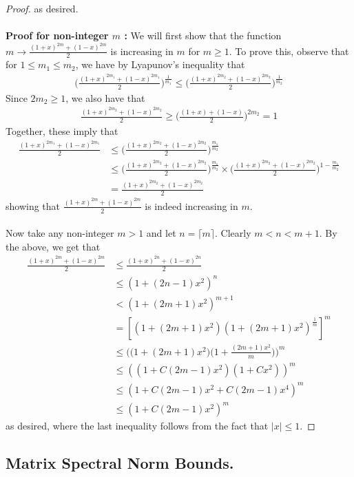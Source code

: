 \documentclass[11pt, reqno,english]{amsart}
\begin{document}
\begin{proof}
as desired. 
\\\\
\textbf{Proof for non-integer $m$ :}
We will first show that the function $m \to \frac{(1 + x)^{2m} + (1 - x)^{2m}}{2}$ is increasing in $m$ for $m \geq 1$. To prove this, observe that for $1 \leq m_1 \leq m_2$, we have by Lyapunov's inequality that
\begin{align*}
\bigg(\frac{(1 + x)^{2m_1} + (1 - x)^{2m_1}}{2}\bigg)^{\frac{1}{m_1}} \leq \bigg(\frac{(1 + x)^{2m_2} + (1 - x)^{2m_2}}{2}\bigg)^{\frac{1}{m_2}} 
\end{align*}
Since $2m_2 \geq 1$, we also have that
\begin{align*}
\frac{(1 + x)^{2m_2} + (1 - x)^{2m_2}}{2} \geq \bigg(\frac{(1 + x) + (1 - x)}{2}\bigg)^{2m_2} = 1
\end{align*}
Together, these imply that
\begin{align*}
\frac{(1 + x)^{2m_1} + (1 - x)^{2m_1}}{2} &\leq \bigg(\frac{(1 + x)^{2m_2} + (1 - x)^{2m_2}}{2}\bigg)^{\frac{m_1}{m_2}}
\\
&\leq \bigg(\frac{(1 + x)^{2m_2} + (1 - x)^{2m_2}}{2}\bigg)^{\frac{m_1}{m_2}} \times \bigg(\frac{(1 + x)^{2m_2} + (1 - x)^{2m_2}}{2}\bigg)^{1 - \frac{m_1}{m_2}}
\\
&= \frac{(1 + x)^{2m_2} + (1 - x)^{2m_2}}{2}
\end{align*}
showing that $\frac{(1 + x)^{2m} + (1 - x)^{2m}}{2}$ is indeed increasing in $m$.
\\\\
Now take any non-integer $m > 1$ and let $n = \lceil m \rceil$. Clearly $m < n < m + 1$. By the above, we get that
\begin{align*}
\frac{(1 + x)^{2m} + (1 - x)^{2m}}{2} &\leq \frac{(1 + x)^{2n} + (1 - x)^{2n}}{2}
\\
&\leq (1 + (2n-1)x^2)^n
\\
&< (1 + (2m + 1)x^2)^{m+1}
\\
& = [(1 + (2m+1)x^2)(1 + (2m+1)x^2)^{\frac{1}{m}}]^m
\\
&\leq \bigg(\bigg(1 + (2m+1)x^2\bigg)\bigg(1 + \frac{(2m+1)x^2}{m}\bigg)\bigg)^{m}
\\
&\leq ((1 + C(2m-1)x^2)(1 + Cx^2))^m
\\
&\leq (1 + C(2m-1)x^2 + C(2m-1)x^4)^m
\\
&\leq (1 + C(2m-1)x^2)^m
\end{align*}
as desired, where the last inequality follows from the fact that $|x| \leq 1$.
\end{proof}
\subsection{Matrix Spectral Norm Bounds.}
\end{document}
